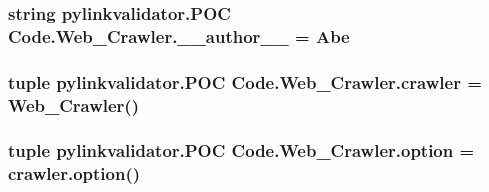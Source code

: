 \subsubsection[{\+\_\+\+\_\+author\+\_\+\+\_\+}]{\setlength{\rightskip}{0pt plus 5cm}string pylinkvalidator.\+P\+OC Code.\+Web\+\_\+\+Crawler.\+\_\+\+\_\+author\+\_\+\+\_\+ = \textquotesingle{}Abe\textquotesingle{}}\hypertarget{namespacepylinkvalidator_1_1_p_o_c_01_code_1_1_web___crawler_a29affd71d39a1882ce8bba5aab752d93}{}\label{namespacepylinkvalidator_1_1_p_o_c_01_code_1_1_web___crawler_a29affd71d39a1882ce8bba5aab752d93}
\subsubsection[{crawler}]{\setlength{\rightskip}{0pt plus 5cm}tuple pylinkvalidator.\+P\+OC Code.\+Web\+\_\+\+Crawler.\+crawler = {\bf Web\+\_\+\+Crawler}()}\hypertarget{namespacepylinkvalidator_1_1_p_o_c_01_code_1_1_web___crawler_a5705d7998995ead364d203ed5cf4410c}{}\label{namespacepylinkvalidator_1_1_p_o_c_01_code_1_1_web___crawler_a5705d7998995ead364d203ed5cf4410c}
\subsubsection[{option}]{\setlength{\rightskip}{0pt plus 5cm}tuple pylinkvalidator.\+P\+OC Code.\+Web\+\_\+\+Crawler.\+option = crawler.\+option()}\hypertarget{namespacepylinkvalidator_1_1_p_o_c_01_code_1_1_web___crawler_ab229bf4382abf99f92e073a92aa85348}{}\label{namespacepylinkvalidator_1_1_p_o_c_01_code_1_1_web___crawler_ab229bf4382abf99f92e073a92aa85348}
